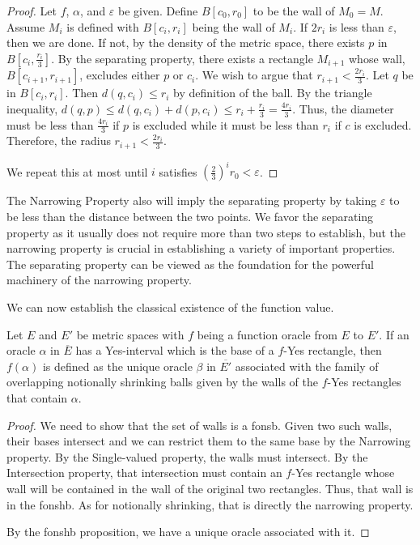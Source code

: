 \begin{proof}
    Let $f$, $\alpha$, and $\varepsilon$ be given. Define $B[c_0, r_0]$ to be the wall of $M_0 =M $. Assume $M_i$ is defined with $B[c_i, r_i]$ being the wall of $M_i$. If $2r_i$ is less than $\varepsilon$, then we are done. If not, by the density of the metric space, there exists $p$ in $B[c_i, \frac{r_i}{3}]$. By the separating property, there exists a rectangle $M_{i+1}$ whose wall, $B[c_{i+1}, r_{i+1}]$, excludes either $ p$ or $c_i$. We wish to argue that $r_{i+1} < \frac{2r_i}{3}$. Let $q$ be in $B[c_i, r_i]$. Then $d(q, c_i) \leq r_i$ by definition of the ball.  By the triangle inequality, $d(q, p) \leq d(q,c_i) + d(p, c_i) \leq r_i + \frac{r_i}{3}= \frac{4 r_i}{3}$. Thus, the diameter must be less than $\frac{4r_i}{3}$ if $p$ is excluded while it must be less than $r_i$ if $c$ is excluded. Therefore, the radius $r_{i+1} < \frac{2r_i}{3}$. 

    We repeat this at most until $i$ satisfies $(\frac{2}{3})^i r_0 < \varepsilon$. 
\end{proof}

The Narrowing Property also will imply the separating property by taking $\varepsilon$ to be less than the distance between the two points. We favor the separating property as it usually does not require more than two steps to establish, but the narrowing property is crucial in establishing a variety of important properties. The separating property can be viewed as the foundation for the powerful machinery of the narrowing property. 

We can now establish the classical existence of the function value.

\begin{proposition}
Let $E$ and $E'$ be metric spaces with $f$ being a function oracle from $E$ to $E'$. If an oracle $\alpha$ in $\overline{E}$ has a Yes-interval which is the base of a $f$-Yes rectangle, then $f(\alpha)$ is defined as the unique oracle $\beta$ in $\overline{E'}$ associated with the family of overlapping notionally shrinking balls given by the walls of the $f$-Yes rectangles that contain $\alpha$. 
\end{proposition}

\begin{proof}
We need to show that the set of walls is a fonsb. Given two such walls, their bases intersect and we can restrict them to the same base by the Narrowing property. By the Single-valued property, the walls must intersect. By the Intersection property, that intersection must contain an $f$-Yes rectangle whose wall will be contained in the wall of the original two rectangles. Thus, that wall is in the fonshb. As for notionally shrinking, that is directly the narrowing property. 

By the fonshb proposition, we have a unique oracle associated with it. 
\end{proof}

